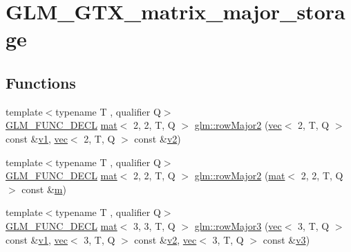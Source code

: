 \hypertarget{group__gtx__matrix__major__storage}{}\section{G\+L\+M\+\_\+\+G\+T\+X\+\_\+matrix\+\_\+major\+\_\+storage}
\label{group__gtx__matrix__major__storage}
\subsection*{Functions}
\begin{DoxyCompactItemize}
\item 
{\footnotesize template$<$typename T , qualifier Q$>$ }\\\mbox{\hyperlink{setup_8hpp_ab2d052de21a70539923e9bcbf6e83a51}{G\+L\+M\+\_\+\+F\+U\+N\+C\+\_\+\+D\+E\+CL}} \mbox{\hyperlink{structglm_1_1mat}{mat}}$<$ 2, 2, T, Q $>$ \mbox{\hyperlink{group__gtx__matrix__major__storage_gaf5b1aee9e3eb1acf9d6c3c8be1e73bb8}{glm\+::row\+Major2}} (\mbox{\hyperlink{structglm_1_1vec}{vec}}$<$ 2, T, Q $>$ const \&\mbox{\hyperlink{_s_d_l__opengl__glext_8h_a435c176a02c061b43e19bdf7c86cceae}{v1}}, \mbox{\hyperlink{structglm_1_1vec}{vec}}$<$ 2, T, Q $>$ const \&\mbox{\hyperlink{_s_d_l__opengl__glext_8h_a0928f6d0f0f794ba000a21dfae422136}{v2}})
\item 
{\footnotesize template$<$typename T , qualifier Q$>$ }\\\mbox{\hyperlink{setup_8hpp_ab2d052de21a70539923e9bcbf6e83a51}{G\+L\+M\+\_\+\+F\+U\+N\+C\+\_\+\+D\+E\+CL}} \mbox{\hyperlink{structglm_1_1mat}{mat}}$<$ 2, 2, T, Q $>$ \mbox{\hyperlink{group__gtx__matrix__major__storage_gaf66c75ed69ca9e87462550708c2c6726}{glm\+::row\+Major2}} (\mbox{\hyperlink{structglm_1_1mat}{mat}}$<$ 2, 2, T, Q $>$ const \&\mbox{\hyperlink{_s_d_l__opengl__glext_8h_af593500c283bf1a787a6f947f503a5c2}{m}})
\item 
{\footnotesize template$<$typename T , qualifier Q$>$ }\\\mbox{\hyperlink{setup_8hpp_ab2d052de21a70539923e9bcbf6e83a51}{G\+L\+M\+\_\+\+F\+U\+N\+C\+\_\+\+D\+E\+CL}} \mbox{\hyperlink{structglm_1_1mat}{mat}}$<$ 3, 3, T, Q $>$ \mbox{\hyperlink{group__gtx__matrix__major__storage_ga2ae46497493339f745754e40f438442e}{glm\+::row\+Major3}} (\mbox{\hyperlink{structglm_1_1vec}{vec}}$<$ 3, T, Q $>$ const \&\mbox{\hyperlink{_s_d_l__opengl__glext_8h_a435c176a02c061b43e19bdf7c86cceae}{v1}}, \mbox{\hyperlink{structglm_1_1vec}{vec}}$<$ 3, T, Q $>$ const \&\mbox{\hyperlink{_s_d_l__opengl__glext_8h_a0928f6d0f0f794ba000a21dfae422136}{v2}}, \mbox{\hyperlink{structglm_1_1vec}{vec}}$<$ 3, T, Q $>$ const \&\mbox{\hyperlink{_s_d_l__opengl__glext_8h_acc806b31cbf466ceba6555983d8b814d}{v3}})

\end{DoxyCompactItemize}
